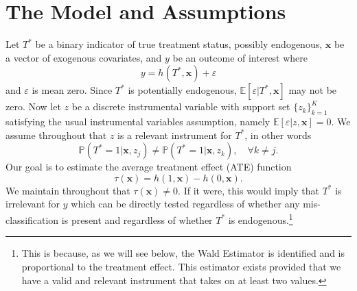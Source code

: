 \section{The Model and Assumptions}
Let $T^*$ be a binary indicator of true treatment status, possibly endogenous, $\mathbf{x}$ be a vector of exogenous covariates, and $y$ be an outcome of interest where
\begin{equation}
  y = h(T^*, \mathbf{x}) + \varepsilon
  \label{eq:model}
\end{equation}
and $\varepsilon$ is mean zero.
Since $T^*$ is potentially endogenous, $\mathbb{E}[\varepsilon|T^*,\mathbf{x}]$ may not be zero.
Now let $z$ be a discrete instrumental variable with support set $\{z_k\}_{k=1}^K$ satisfying the usual instrumental variables assumption, namely $\mathbb{E}[\varepsilon|z,\mathbf{x}]=0$.
We assume throughout that $z$ is a relevant instrument for $T^*$, in other words 
\begin{equation}
\mathbb{P}(T^*=1|\mathbf{x},z_j)\neq \mathbb{P}(T^*=1|\mathbf{x},z_k), \quad \forall k\neq j.
\label{eq:relevance}
\end{equation}
Our goal is to estimate the average treatment effect (ATE) function
\begin{equation}
  \tau(\mathbf{x}) = h(1,\mathbf{x}) - h(0,\mathbf{x}).
  \label{eq:ATE}
\end{equation}
We maintain throughout that $\tau(\mathbf{x}) \neq 0$.
If it were, this would imply that $T^*$ is irrelevant for $y$ which can be directly tested regardless of whether any mis-classification is present and regardless of whether $T^*$ is endogenous.\footnote{This is because, as we will see below, the Wald Estimator is identified and is proportional to the treatment effect. This estimator exists provided that we have a valid and relevant instrument that takes on at least two values.} 

